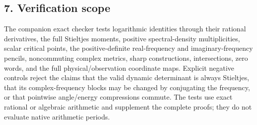 \documentclass[10pt]{article}
\begin{document}
\subsection{7. Verification scope}\label{verification-scope}

The companion exact checker tests logarithmic identities through their rational derivatives, the full Stieltjes moments, positive spectral-density multiplicities, scalar critical points, the positive-definite real-frequency and imaginary-frequency pencils, noncommuting complex metrics, sharp constructions, intersections, zero words, and the full physical/observation coordinate maps. Explicit negative controls reject the claims that the valid dynamic determinant is always Stieltjes, that its complex-frequency blocks may be changed by conjugating the frequency, or that pointwise angle/energy compressions commute. The tests use exact rational or algebraic arithmetic and supplement the complete proofs; they do not evaluate native arithmetic periods.
\end{document}

